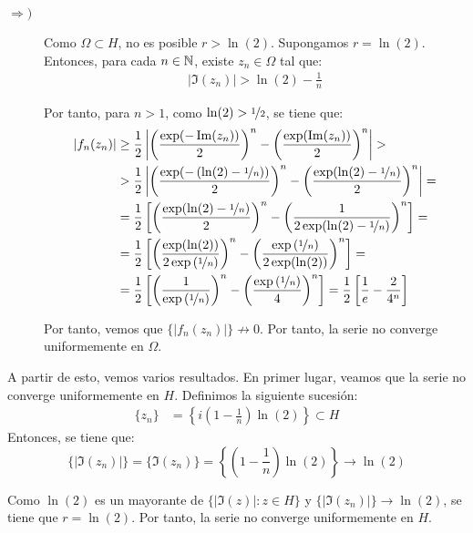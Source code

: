 \begin{ejercicio}
\begin{description}
        \item[$\Longrightarrow)$] Como $\Omega\subset H$, no es posible $r>\ln(2)$. Supongamos $r=\ln(2)$. Entonces, para cada $n\in \bb{N}$, existe $z_n\in \Omega$ tal que:
        \begin{align*}
            |\Im(z_n)| > \ln(2)-\frac{1}{n}
        \end{align*}

        Por tanto, para $n>1$, como $\ln(2)>\nicefrac{1}{2}$, se tiene que:
        \begin{align*}
            |f_n(z_n)| &\geq \dfrac{1}{2}\left|\left(\dfrac{\exp(-\Im(z_n))}{2}\right)^{n}-\left(\dfrac{\exp(\Im(z_n))}{2}\right)^{n}\right|
            >\\& > \dfrac{1}{2}\left|\left(\dfrac{\exp(-\left(\ln(2)-\nicefrac{1}{n}\right))}{2}\right)^{n}-\left(\dfrac{\exp(\ln(2)-\nicefrac{1}{n})}{2}\right)^{n}\right|
            =\\&= \dfrac{1}{2}\left[\left(\dfrac{\exp(\ln(2)-\nicefrac{1}{n})}{2}\right)^{n}-\left(\dfrac{1}{2\exp(\ln(2)-\nicefrac{1}{n})}\right)^{n}\right]
            =\\&= \dfrac{1}{2}\left[\left(\dfrac{\exp(\ln(2))}{2\exp\left(\nicefrac{1}{n}\right)}\right)^{n}-\left(\dfrac{\exp\left(\nicefrac{1}{n}\right)}{2\exp(\ln(2))}\right)^{n}\right]
            =\\&= \dfrac{1}{2}\left[\left(\dfrac{1}{\exp\left(\nicefrac{1}{n}\right)}\right)^{n}-\left(\dfrac{\exp\left(\nicefrac{1}{n}\right)}{4}\right)^{n}\right]
            = \dfrac{1}{2}\left[\dfrac{1}{e}-\dfrac{2}{4^n}\right]
        \end{align*}

        Por tanto, vemos que $\{|f_n(z_n)|\}\not\to 0$. Por tanto, la serie no converge uniformemente en $\Omega$.
    \end{description}

    A partir de esto, vemos varios resultados. En primer lugar, veamos que la serie no converge uniformemente en $H$. Definimos la siguiente sucesión:
    \begin{align*}
        \{z_n\} &= \left\{i\left(1-\frac{1}{n}\right)\ln(2)\right\}\subset H
    \end{align*}
    Entonces, se tiene que:
    \begin{equation*}
        \{|\Im(z_n)|\} = \{\Im(z_n)\} = \left\{\left(1-\frac{1}{n}\right)\ln(2)\right\}\to \ln(2)
    \end{equation*}

    Como $\ln(2)$ es un mayorante de $\{|\Im(z)| : z\in H\}$ y $\{|\Im(z_n)|\}\to \ln(2)$, se tiene que $r=\ln(2)$. Por tanto, la serie no converge uniformemente en $H$.\\


\end{ejercicio}
